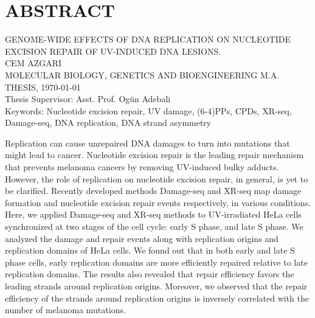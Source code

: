 \setcounter{page}{3}
\chapter*{\vspace{-4\baselineskip} \bf ABSTRACT} 

\begin{center}
\MakeUppercase{GENOME-WIDE EFFECTS OF DNA REPLICATION ON
NUCLEOTIDE EXCISION REPAIR OF UV-INDUCED
DNA LESIONS.} \\[3\baselineskip]
\MakeUppercase{Cem Azgari} \\[\baselineskip]
MOLECULAR BIOLOGY, GENETICS AND BIOENGINEERING M.A. THESIS, \Cemdateformat\today \\[\baselineskip]
Thesis Supervisor: Asst. Prof. Ogün Adebali \\[2\baselineskip]
Keywords: Nucleotide excision repair, UV damage, (6-4)PPs, CPDs, XR-seq, Damage-seq, DNA replication, DNA strand asymmetry \\[2\baselineskip]
\end{center}

\singlespacing
Replication can cause unrepaired DNA damages to turn into mutations that might lead to cancer. Nucleotide excision repair is the leading repair mechanism that prevents melanoma cancers by removing UV-induced bulky adducts. However, the role of replication on nucleotide excision repair, in general, is yet to be clarified. Recently developed methods Damage-seq and XR-seq map damage formation and nucleotide excision repair events respectively, in various conditions. Here, we applied Damage-seq and XR-seq methods to UV-irradiated HeLa cells synchronized at two stages of the cell cycle: early S phase, and late S phase. We analyzed the damage and repair events along with replication origins and replication domains of HeLa cells. We found out that in both early and late S phase cells, early replication domains are more efficiently repaired relative to late replication domains. The results also revealed that repair efficiency favors the leading strands around replication origins. Moreover, we observed that the repair efficiency of the strands around replication origins is inversely correlated with the number of melanoma mutations.

\clearpage\pagebreak
\onehalfspacing
